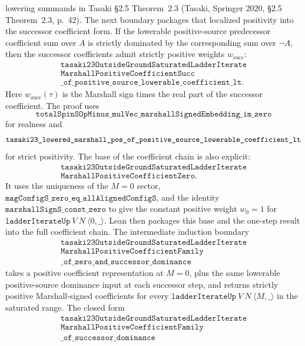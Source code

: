 \documentclass[a4paper,11pt]{article}
\begin{document}
lowering summands in Tasaki §2.5 Theorem~2.3 (Tasaki, Springer 2020,
§2.5 Theorem~2.3, p.~42).
The next boundary packages that localized positivity into the successor
coefficient form.  If the lowerable positive-source predecessor coefficient
sum over \(A\) is strictly dominated by the corresponding sum over
\(\neg A\), then the successor coefficients admit strictly positive weights
\(w_{\mathrm{succ}}\):
\[
\begin{gathered}
\texttt{tasaki23OutsideGroundSaturatedLadderIterate}\\
\texttt{MarshallPositiveCoefficientSucc}\\
\texttt{\_of\_positive\_source\_lowerable\_coefficient\_lt}.
\end{gathered}
\]
Here \(w_{\mathrm{succ}}(\tau)\) is the Marshall sign times the real part of
the successor coefficient.  The proof uses
\[
\texttt{totalSpinSOpMinus\_mulVec\_marshallSignedEmbedding\_im\_zero}
\]
for realness and
\[
\texttt{tasaki23\_lowered\_marshall\_pos}\\
\texttt{\_of\_positive\_source\_lowerable\_coefficient\_lt}
\]
for strict positivity.
The base of the coefficient chain is also explicit:
\[
\begin{gathered}
\texttt{tasaki23OutsideGroundSaturatedLadderIterate}\\
\texttt{MarshallPositiveCoefficientZero}.
\end{gathered}
\]
It uses the uniqueness of the \(M=0\) sector,
\(\texttt{magConfigS\_zero\_eq\_allAlignedConfigS}\), and the identity
\(\texttt{marshallSignS\_const\_zero}\) to give the constant positive weight
\(w_0=1\) for \(\texttt{ladderIterateUp}\ V\ N\ \langle0,\_\rangle\).
Lean then packages this base and the one-step result into the full coefficient
chain.  The intermediate induction boundary
\[
\begin{gathered}
\texttt{tasaki23OutsideGroundSaturatedLadderIterate}\\
\texttt{MarshallPositiveCoefficientFamily}\\
\texttt{\_of\_zero\_and\_successor\_dominance}
\end{gathered}
\]
takes a positive coefficient representation at \(M=0\), plus the same
lowerable positive-source dominance input at each successor step, and returns
strictly positive Marshall-signed coefficients for every
\(\texttt{ladderIterateUp}\ V\ N\ \langle M,\_\rangle\) in the saturated range.
The closed form
\[
\begin{gathered}
\texttt{tasaki23OutsideGroundSaturatedLadderIterate}\\
\texttt{MarshallPositiveCoefficientFamily}\\
\texttt{\_of\_successor\_dominance}
\end{gathered}
\]
\end{document}
